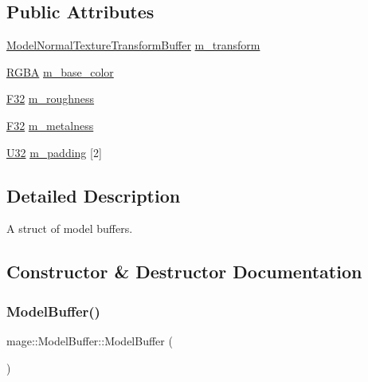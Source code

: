 \subsection*{Public Attributes}
\begin{DoxyCompactItemize}
\item 
\hyperlink{structmage_1_1_model_normal_texture_transform_buffer}{Model\+Normal\+Texture\+Transform\+Buffer} \hyperlink{structmage_1_1_model_buffer_adb77c7da1573f0d94665b73ea1887420}{m\+\_\+transform}
\item 
\hyperlink{structmage_1_1_r_g_b_a}{R\+G\+BA} \hyperlink{structmage_1_1_model_buffer_aaad37de854c5ba951107d2c18880fbbd}{m\+\_\+base\+\_\+color}
\item 
\hyperlink{namespacemage_aa97e833b45f06d60a0a9c4fc22ae02c0}{F32} \hyperlink{structmage_1_1_model_buffer_a33adb9ff193fcccf618bf6ceb7b1a31e}{m\+\_\+roughness}
\item 
\hyperlink{namespacemage_aa97e833b45f06d60a0a9c4fc22ae02c0}{F32} \hyperlink{structmage_1_1_model_buffer_a1be491fffd79c3e5d37d066f0ef9ab96}{m\+\_\+metalness}
\item 
\hyperlink{namespacemage_a41c104c036fba3756a74e19f793eeaa1}{U32} \hyperlink{structmage_1_1_model_buffer_a11ae104f8ba32afbd910a2f18d04d352}{m\+\_\+padding} \mbox{[}2\mbox{]}
\end{DoxyCompactItemize}


\subsection{Detailed Description}
A struct of model buffers. 

\subsection{Constructor \& Destructor Documentation}
\hypertarget{structmage_1_1_model_buffer_a70d4043128afebd2aaff7c57246f98a2}{}\label{structmage_1_1_model_buffer_a70d4043128afebd2aaff7c57246f98a2} 
\subsubsection{\texorpdfstring{Model\+Buffer()}{ModelBuffer()}\hspace{0.1cm}{\footnotesize\ttfamily [1/3]}}
{\footnotesize\ttfamily mage\+::\+Model\+Buffer\+::\+Model\+Buffer (\begin{DoxyParamCaption}{ }\end{DoxyParamCaption})\hspace{0.3cm}{\ttfamily [noexcept]}}


